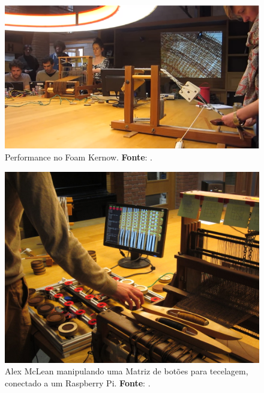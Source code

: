 \begin{figure}[!h]
  \centering
  \includegraphics[scale=0.71]{imagens/weaving.png}
  \caption{Performance no Foam Kernow. \textbf{Fonte}: .}
  \label{fig:weavecoding}
\end{figure}

\begin{figure}[h]
  \centering
  \includegraphics[scale=0.85]{imagens/weavecoding.jpg}
  \caption{ Alex McLean manipulando uma Matriz de botões para tecelagem, conectado a um Raspberry Pi. \textbf{Fonte}: .}
  \label{fig:weavecoding2}
\end{figure}

